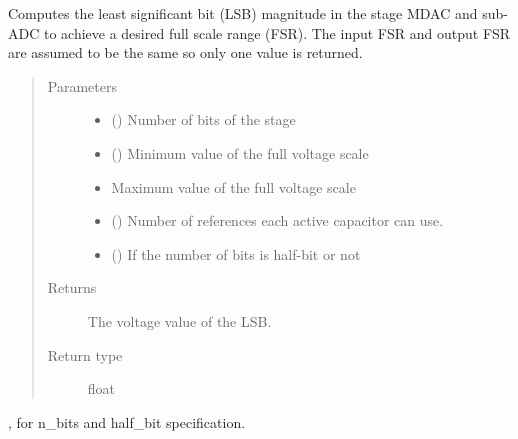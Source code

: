 \documentclass[letterpaper,10pt,english]{sphinxmanual}
\begin{document}
\begin{fulllineitems}
\label{\detokenize{gen:calib.gen.compute_lsb}}
Computes the least significant bit (LSB) magnitude in the stage MDAC and
sub-ADC to achieve a desired full scale range (FSR). The input FSR and
output FSR are assumed to be the same so only one value is returned.
\begin{quote}\begin{description}
\item[{Parameters}] \leavevmode\begin{itemize}
\item {} 
 (\sphinxstyleliteralemphasis{\sphinxupquote{, }}\sphinxstyleliteralemphasis{\sphinxupquote{, }}) \textendash{} Number of bits of the stage

\item {} 
 () \textendash{} Minimum value of the full voltage scale

\item {} 
 \textendash{} Maximum value of the full voltage scale

\item {} 
 () \textendash{} Number of references each active capacitor can use.

\item {} 
 () \textendash{} If the number of bits is half-bit or not

\end{itemize}

\item[{Returns}] \leavevmode
The voltage value of the LSB.

\item[{Return type}] \leavevmode
float

\end{description}\end{quote}




{\hyperref[\detokenize{gen:calib.gen.parse_bits}]{}}, for n\_bits and half\_bit specification.



\end{fulllineitems}
\end{document}
